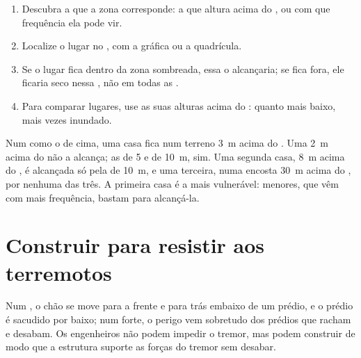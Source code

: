 \begin{method}
\begin{enumerate}
  \item Descubra a que  a zona corresponde: a que altura acima
        do , ou com que frequência ela pode vir.
  \item Localize o lugar no , com a  gráfica ou a quadrícula.
  \item Se o lugar fica dentro da zona sombreada, essa  o
        alcançaria; se fica fora, ele ficaria seco nessa , não em
        todas as .
  \item Para comparar lugares, use as suas alturas acima do : quanto
        mais baixo, mais vezes inundado.
\end{enumerate}
\end{method}

\begin{example}
Num  como o de cima, uma casa fica num terreno \qty{3}{m} acima do
. Uma  \qty{2}{m} acima do  não a alcança; as 
de 5 e de \qty{10}{m}, sim. Uma segunda casa, \qty{8}{m} acima do , é
alcançada só pela  de \qty{10}{m}, e uma terceira, numa encosta
\qty{30}{m} acima do , por nenhuma das três. A primeira casa é a mais
vulnerável:  menores, que vêm com mais frequência, bastam para
alcançá-la.
\end{example}

\section{Construir para resistir aos terremotos}

Num , o chão se move para a frente e para trás embaixo de um
prédio, e o prédio é sacudido por baixo; num  forte, o perigo
vem sobretudo dos prédios que racham e desabam. Os engenheiros não podem
impedir o tremor, mas podem construir de modo que a estrutura suporte as
forças do tremor sem desabar.

